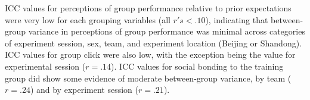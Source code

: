 








ICC values for perceptions of group performance relative to prior expectations were very low for each grouping variables (all $r's < .10$), indicating that between-group variance in perceptions of group performance was minimal across categories of experiment session, sex, team, and experiment location (Beijing or Shandong).  ICC values for group click were also low, with the exception being the value for experimental session ($r = .14$).  ICC values for social bonding to the training group did show some evidence of moderate between-group variance, by team ($r = .24$) and by experiment session ($r = .21$).








